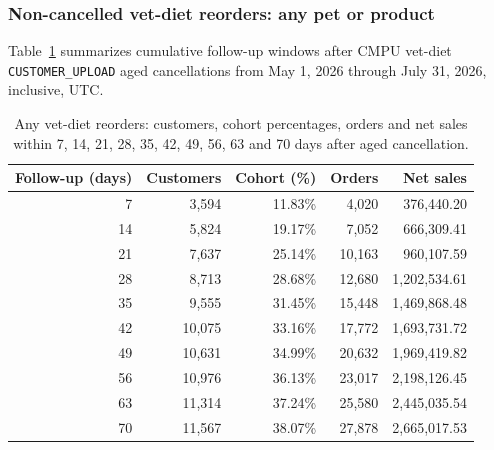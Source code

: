 \clearpage
\subsubsection{Non-cancelled vet-diet reorders: any pet or product}
Table~\ref{tab:financial-opportunity-reorder-any-vet-diet} summarizes cumulative
follow-up windows after CMPU vet-diet \texttt{CUSTOMER\_UPLOAD} aged cancellations
from May 1, 2026 through July 31, 2026, inclusive, UTC.

\begin{table}[!htbp]
\centering
\caption{Any vet-diet reorders: customers, cohort percentages, orders and net sales within 7, 14, 21, 28, 35, 42, 49, 56, 63 and 70 days after aged cancellation.}
\label{tab:financial-opportunity-reorder-any-vet-diet}
\begin{tabular}{@{}rrrrr@{}}
\toprule
Follow-up (days) & Customers & Cohort (\%) & Orders & Net sales \\
\midrule
7 & 3,594 & 11.83\% & 4,020 & 376,440.20 \\
14 & 5,824 & 19.17\% & 7,052 & 666,309.41 \\
21 & 7,637 & 25.14\% & 10,163 & 960,107.59 \\
28 & 8,713 & 28.68\% & 12,680 & 1,202,534.61 \\
35 & 9,555 & 31.45\% & 15,448 & 1,469,868.48 \\
42 & 10,075 & 33.16\% & 17,772 & 1,693,731.72 \\
49 & 10,631 & 34.99\% & 20,632 & 1,969,419.82 \\
56 & 10,976 & 36.13\% & 23,017 & 2,198,126.45 \\
63 & 11,314 & 37.24\% & 25,580 & 2,445,035.54 \\
70 & 11,567 & 38.07\% & 27,878 & 2,665,017.53 \\
\bottomrule
\end{tabular}


\end{table}
